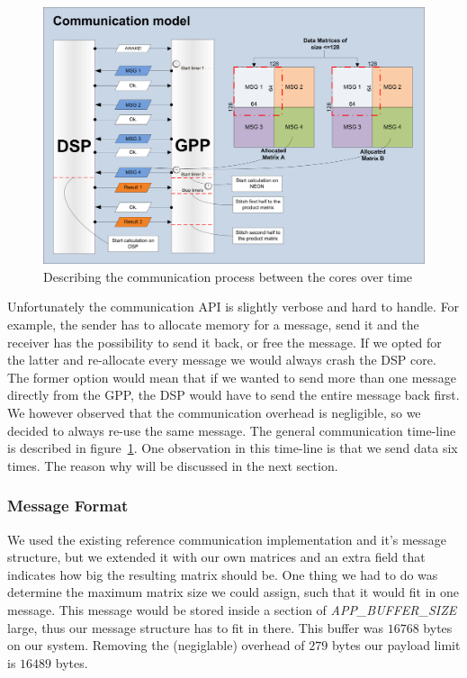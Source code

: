 \begin{figure}[h]
\includegraphics[width=\textwidth]{images/gpp_dsp_com}
\caption{Describing the communication process between the cores over time}
\label{fig:gpp_dsp_com}
\end{figure}

Unfortunately the communication API is slightly verbose and hard to handle.
For example, the sender has to allocate memory for a message, send it and the
receiver has the possibility to send it back, or free the message. If we opted
for the latter and re-allocate every message we would always crash the DSP core.
The former option would mean that if we wanted to send more than one message
directly from the GPP, the DSP would have to send the entire message back first.
We however observed that the communication overhead is negligible, so we
decided to always re-use the same message. The general communication time-line
is described in figure~\ref{fig:gpp_dsp_com}. One observation in this time-line
is that we send data six times. The reason why will be discussed in the next
section.

\subsubsection{Message Format}
We used the existing reference communication implementation and it's message
structure, but we extended it with our own matrices and an extra field that
indicates how big the resulting matrix should be. One thing we had to do
was determine the maximum matrix size we could assign, such that it would fit
in one message. This message would be stored inside a section of
\emph{APP\_BUFFER\_SIZE} large, thus our message structure has to fit in there.
This buffer was $16768$ bytes on our system.
Removing the (negiglable) overhead of $279$ bytes our payload limit is $16489$ bytes.


